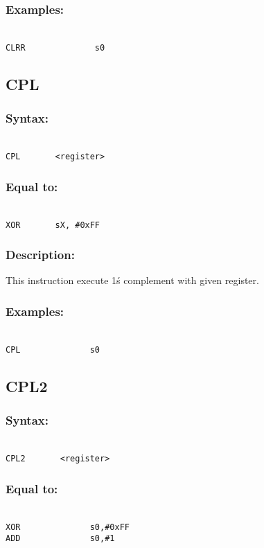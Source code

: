         \subsubsection{Examples:}
        {
            ~\\
            \usecodefont
            \verb'CLRR              s0'\\
        }

    \subsection{CPL}
        \subsubsection{Syntax:}
        {
            ~\\
            \usecodefont
            \verb'CPL       <register>'
        }
        \subsubsection{Equal to:}
        {
            ~\\
            \usecodefont
            \verb'XOR       sX, #0xFF'
        }
        \subsubsection{Description:}
            This instruction execute 1\'s complement with given register.

        \subsubsection{Examples:}
        {
            ~\\
            \usecodefont
            \verb'CPL              s0'\\
        }

    \subsection{CPL2}
        \subsubsection{Syntax:}
        {
            ~\\
            \usecodefont
            \verb'CPL2       <register>'
        }
        \subsubsection{Equal to:}
        {
            ~\\
            \usecodefont
            \verb'XOR              s0,#0xFF'\\
            \verb'ADD              s0,#1'\\
        }

